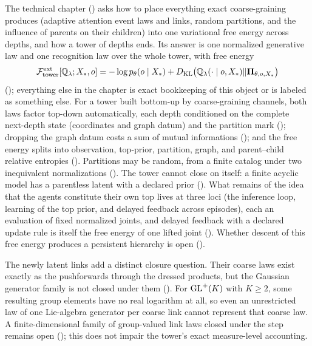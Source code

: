 The technical chapter () asks how to place everything exact
coarse-graining produces (adaptive attention event laws and links, random partitions, and the influence
of parents on their children) into one variational free energy across depths, and how a tower of depths
ends. Its answer is one normalized generative law and one recognition law over the whole tower, with
free energy
\[
\mathcal F^{\mathrm{ext}}_{\mathrm{tower}}[\mathbb Q_\lambda;X_*,o]
=-\log p_\theta(o\mid X_*)
+D_{\mathrm{KL}}\bigl(\mathbb Q_\lambda(\cdot\mid o,X_*)\Vert\boldsymbol\Pi_{\theta,o,X_*}\bigr)
\]
(); everything else in the chapter is exact bookkeeping of this object or
is labeled as something else. For a tower built bottom-up by coarse-graining channels, both laws factor
top-down automatically, each depth conditioned on the complete next-depth state (coordinates and graph
datum) and the partition mark (); dropping the graph datum costs a
sum of mutual informations (); and the free energy splits into
observation, top-prior, partition, graph, and parent--child relative entropies
(). Partitions may be random, from a finite catalog under two
inequivalent normalizations (). The tower cannot close on itself: a finite
acyclic model has a parentless latent with a declared prior ().
What remains of the idea that the agents constitute their own top lives at three loci (the inference
loop, learning of the top prior, and delayed feedback across episodes), each an evaluation of fixed
normalized joints, and delayed feedback with a declared update rule is itself the free energy of one
lifted joint (). Whether descent of this free energy produces a
persistent hierarchy is open ().

The newly latent links add a distinct closure question. Their coarse laws exist exactly as the
pushforwards through the dressed products, but the Gaussian generator family is not closed under them
(). For $\mathrm{GL}^+(K)$ with $K\ge2$, some resulting group elements
have no real logarithm at all, so even an unrestricted law of one Lie-algebra generator per coarse
link cannot represent that coarse law. A finite-dimensional family of group-valued link laws closed
under the step remains open (); this does not impair the tower's exact
measure-level accounting.

